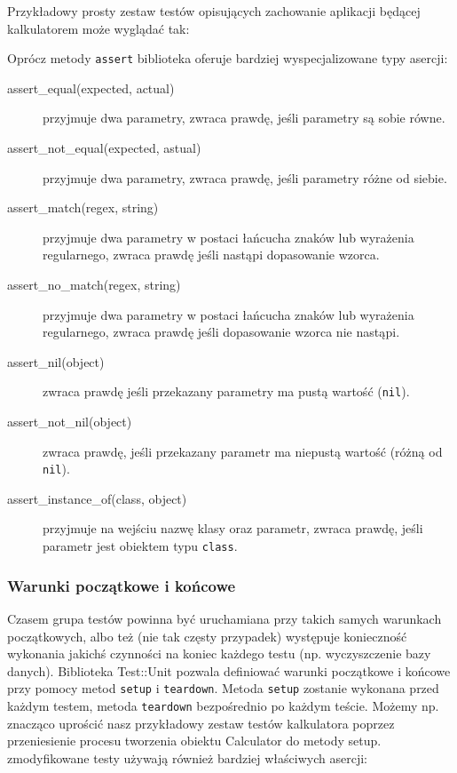      Przykładowy prosty zestaw testów opisujących zachowanie aplikacji będącej kalkulatorem może wyglądać tak:
     
     
     
     Oprócz metody \verb+assert+ biblioteka oferuje bardziej wyspecjalizowane typy asercji:
     
     \begin{description}
       \item[assert\_equal(expected, actual)] przyjmuje dwa parametry, zwraca prawdę, jeśli parametry są sobie równe.
       \item[assert\_not\_equal(expected, astual)] przyjmuje dwa parametry, zwraca prawdę, jeśli parametry różne od siebie.
       \item[assert\_match(regex, string)] przyjmuje dwa parametry w postaci łańcucha znaków lub wyrażenia regularnego, zwraca prawdę jeśli nastąpi dopasowanie wzorca.
       \item[assert\_no\_match(regex, string)] przyjmuje dwa parametry w postaci łańcucha znaków lub wyrażenia regularnego, zwraca prawdę jeśli dopasowanie wzorca nie nastąpi.
       \item[assert\_nil(object)] zwraca prawdę jeśli przekazany parametry ma pustą wartość (\verb+nil+).
       \item[assert\_not\_nil(object)] zwraca prawdę, jeśli przekazany parametr ma niepustą wartość (różną od \verb+nil+).
       \item[assert\_instance\_of(class, object)] przyjmuje na wejściu nazwę klasy oraz parametr, zwraca prawdę, jeśli parametr jest obiektem typu \verb+class+.
    \end{description}
    
    \subsubsection{Warunki początkowe i końcowe}
    Czasem grupa testów powinna być uruchamiana przy takich samych warunkach początkowych, albo też (nie tak częsty przypadek) występuje konieczność wykonania jakichś czynności na koniec każdego testu (np. wyczyszczenie bazy danych). Biblioteka Test::Unit pozwala definiować warunki początkowe i końcowe przy pomocy metod \verb+setup+ i \verb+teardown+.
    Metoda \verb+setup+ zostanie wykonana przed każdym testem, metoda \verb+teardown+ bezpośrednio po każdym teście. Możemy np. znacząco uprościć nasz przykładowy zestaw testów kalkulatora poprzez przeniesienie procesu tworzenia obiektu Calculator do metody setup. zmodyfikowane testy używają również bardziej właściwych asercji:
    
